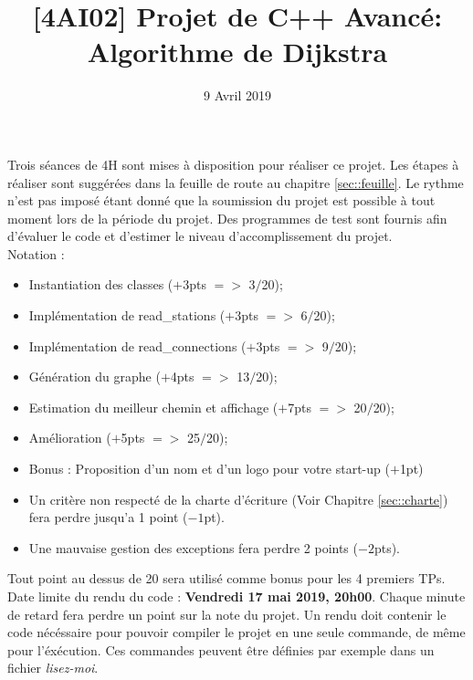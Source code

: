 \documentclass[9pts]{article}
\title{[4AI02] Projet de C++ Avancé: Algorithme de Dijkstra}
\date{9 Avril 2019}
\begin{document}
\makeatletter

\let\ps@plain=\ps@fancy

\makeatother
\maketitle

Trois séances de 4H sont mises à disposition pour réaliser ce projet.
Les étapes à réaliser sont suggérées dans la feuille de route au chapitre \ref{sec::feuille}. Le rythme n'est pas imposé étant donné que la soumission du projet est possible à tout moment lors de la période du projet.
Des programmes de test sont fournis afin d'évaluer le code et d'estimer le niveau d'accomplissement du projet.\\

Notation :
\begin{itemize}
\item Instantiation des classes ($+$3pts $=>$ 3$/$20);
\item Implémentation de read\_stations ($+$3pts $=>$ 6$/$20);
\item Implémentation de read\_connections ($+$3pts $=>$ 9$/$20);
\item Génération du graphe ($+$4pts $=>$ 13$/$20);
\item Estimation du meilleur chemin et affichage ($+$7pts $=>$ 20$/$20);
\item Amélioration ($+$5pts $=>$ 25$/$20);
\item Bonus : Proposition d'un nom et d'un logo pour votre start-up ($+$1pt)
\item Un critère non respecté de la charte d'écriture (Voir Chapitre \ref{sec::charte}) fera perdre jusqu'a 1 point ($-1$pt).
\item Une mauvaise gestion des exceptions fera perdre 2 points ($-2$pts).\\
\end{itemize}

Tout point au dessus de 20 sera utilisé comme bonus pour les 4 premiers TPs.\\

Date limite du rendu du code : \textbf{Vendredi 17 mai 2019, 20h00}. Chaque minute de retard fera perdre un point sur la note du projet. Un rendu doit contenir le code nécéssaire pour pouvoir compiler le projet en une seule commande, de même pour l'éxécution. Ces commandes peuvent être définies par exemple dans un fichier \emph{lisez-moi}. \\
\end{document}

